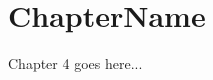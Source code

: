 \documentclass{standalone}
\begin{document}
\chapter{ChapterName}
Chapter 4 goes here...
\end{document}

